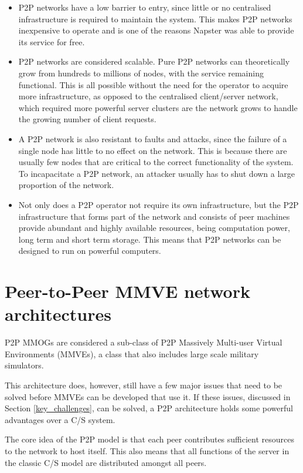 \begin{itemize}
\item P2P networks have a low barrier to entry, since little or no centralised infrastructure is required to maintain the system. This makes P2P networks inexpensive to operate and is one of the reasons Napster was able to provide its service for free.

\item P2P networks are considered scalable. Pure P2P networks can theoretically grow from hundreds to millions of nodes, with the service remaining functional. This is all possible without the need for the operator to acquire more infrastructure, as opposed to the centralised client/server network, which required more powerful server clusters are the network grows to handle the growing number of client requests.

\item A P2P network is also resistant to faults and attacks, since the failure of a single node has little to no effect on the network. This is because there are usually few nodes that are critical to the correct functionality of the system. To incapacitate a P2P network, an attacker usually has to shut down a large proportion of the network.

\item Not only does a P2P operator not require its own infrastructure, but the P2P infrastructure that forms part of the network and consists of peer machines provide abundant and highly available resources, being computation power, long term and short term storage. This means that P2P networks can be designed to run on powerful computers.
\end{itemize}


\section{Peer-to-Peer MMVE network architectures}
\label{p2p_network_architectures}

P2P MMOGs are considered a sub-class of P2P Massively Multi-user Virtual Environments (MMVEs), a class that also includes large scale military simulators.

This architecture does, however, still have a few major issues that need to be solved before MMVEs can be developed that use it. If
these issues, discussed in Section \ref{key_challenges}, can be solved, a P2P architecture holds some powerful advantages over a C/S system.

The core idea of the P2P model is that each peer contributes sufficient resources to the network to host itself. This also means that all functions of the server in the classic C/S model are distributed amongst all peers.

